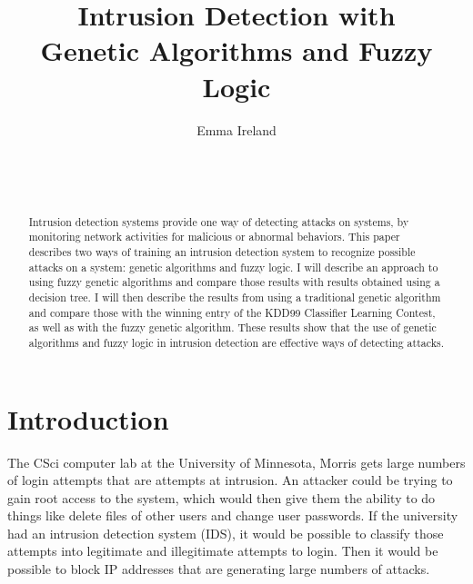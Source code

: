 \documentclass{sig-alternate}
\begin{document}

\title{Intrusion Detection with \\ Genetic Algorithms and Fuzzy Logic}


\author{
\alignauthor
Emma Ireland\\
	\\
	\\
	\\
}

\maketitle
\begin{abstract}
Intrusion detection systems provide one way of detecting attacks on systems, by monitoring network activities for malicious or abnormal behaviors. This paper describes two ways of training an intrusion detection system to recognize possible attacks on a system: genetic algorithms and fuzzy logic. I will describe an approach to using fuzzy genetic algorithms and compare those results with results obtained using a decision tree. I will then describe the results from using a traditional genetic algorithm and compare those with the winning entry of the KDD99 Classifier Learning Contest, as well as with the fuzzy genetic algorithm. These results show that the use of genetic algorithms and fuzzy logic in intrusion detection are effective ways of detecting attacks.
\end{abstract}




\section{Introduction}
The CSci computer lab at the University of Minnesota, Morris gets large numbers of login attempts that are attempts at intrusion. An attacker could be trying to gain root access to the system, which would then give them the ability to do things like delete files of other users and change user passwords. If the university had an intrusion detection system (IDS), it would be possible to classify those attempts into legitimate and illegitimate attempts to login. Then it would be possible to block IP addresses that are generating large numbers of attacks.
\end{document}

